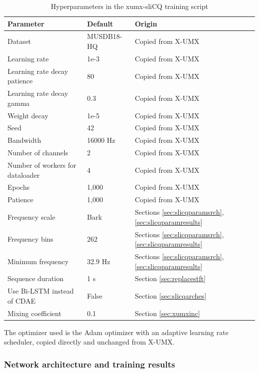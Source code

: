 \documentclass[report.tex]{subfiles}
\begin{document}
\begin{table}[ht]
	\centering
	\caption{Hyperparameters in the xumx-sliCQ training script}
	\label{table:xumxslicqparams}
	\begin{tabular}{ |l|l|l| }
	 \hline
		Parameter & Default & Origin \\
	 \hline
	 \hline
		Dataset & MUSDB18-HQ & Copied from X-UMX \\
	 \hline
		Learning rate & 1e-3 & Copied from X-UMX \\
	 \hline
		Learning rate decay patience & 80 & Copied from X-UMX \\
	 \hline
		Learning rate decay gamma & 0.3 & Copied from X-UMX \\
	 \hline
		Weight decay & 1e-5 & Copied from X-UMX \\
	 \hline
	 	Seed & 42 & Copied from X-UMX \\
	 \hline
	 	Bandwidth & 16000 Hz & Copied from X-UMX \\
	 \hline
	 	Number of channels & 2 & Copied from X-UMX \\
	 \hline
	 	Number of workers for dataloader & 4 & Copied from X-UMX \\
	 \hline
		Epochs & 1,000 & Copied from X-UMX \\
	 \hline
		Patience & 1,000 & Copied from X-UMX \\
	 \hline
		Frequency scale & Bark & Sections \ref{sec:slicqparamsrch}, \ref{sec:slicqparamresults} \\
	 \hline
		Frequency bins & 262 & Sections \ref{sec:slicqparamsrch}, \ref{sec:slicqparamresults} \\
	 \hline
	 	Minimum frequency & 32.9 Hz & Sections \ref{sec:slicqparamsrch}, \ref{sec:slicqparamresults} \\
	 \hline
		Sequence duration & 1 s & Section \ref{sec:replacestft} \\
	 \hline
		Use Bi-LSTM instead of CDAE & False & Section \ref{sec:slicqarches} \\
	 \hline
		Mixing coefficient & 0.1 & Section \ref{sec:xumxinc} \\
	 \hline
\end{tabular}
\end{table}

The optimizer used is the Adam optimizer with an adaptive learning rate scheduler, copied directly and unchanged from X-UMX.

\subsubsection{Network architecture and training results}
\label{sec:networktraining}
\end{document}
